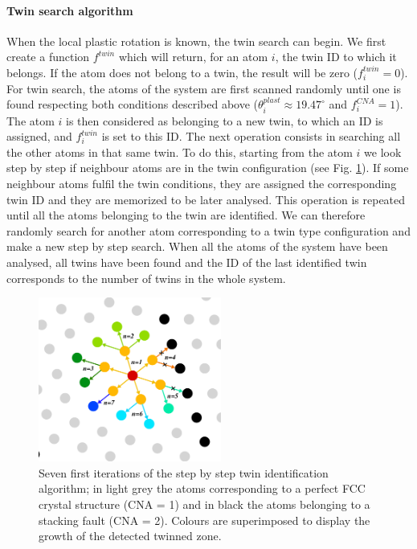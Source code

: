 \documentclass[final,3p,times,twocolumn]{elsarticle}
\begin{document}
\paragraph{Twin search algorithm}
When the local plastic rotation is known, the twin search can begin. We first create a function $ f^{twin} $ which will return, for an atom $ i $, the twin ID to which it belongs. If the atom does not belong to a twin, the result will be zero ($ f^{twin}_{i}=0$). For twin search, the atoms of the system are first scanned randomly until one is found respecting both conditions described above ($ \theta_{i}^{plast} \approx 19.47^{\circ} $ and $f^{CNA}_{i}=1 $). The atom $i$ is then considered as belonging to a new twin, to which an ID is assigned, and $f^{twin}_{i}$ is set to this ID. The next operation consists in searching all the other atoms in that same twin. To do this, starting from the atom $ i $ we look step by step if neighbour atoms are in the twin configuration (see Fig. \ref{fig_A1}). If some neighbour atoms fulfil the twin conditions, they are assigned the corresponding twin ID and they are memorized to be later analysed. This operation is repeated until all the atoms belonging to the twin are identified. We can therefore randomly search for another atom corresponding to a twin type configuration and make a new step by step search. When all the atoms of the system have been analysed, all twins have been found and the ID of the last identified twin corresponds to the number of twins in the whole system.

\begin{figure}[!h]
	\begin{center}
		\includegraphics[width=60mm]{Pic/fig_A1.eps} 
	\end{center}
	\caption{Seven first iterations of the step by step twin identification algorithm; in light grey the atoms corresponding to a perfect FCC crystal structure (CNA = 1) and in black the atoms belonging to a stacking fault (CNA = 2). Colours are superimposed to display the growth of the detected twinned zone.}\label{fig_A1}
\end{figure}
\end{document}
